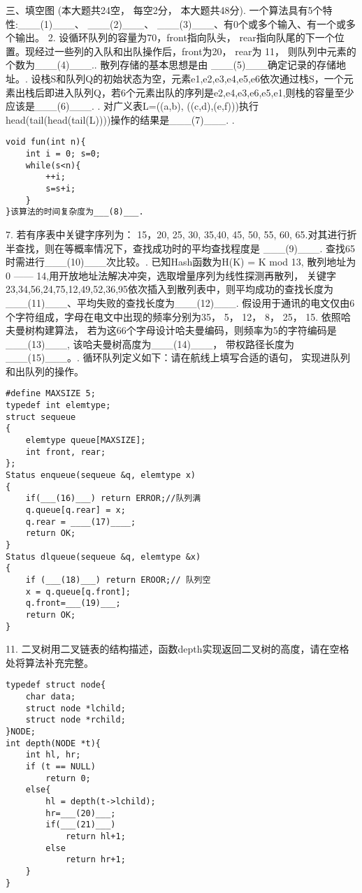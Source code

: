 三、填空图 (本大题共24空， 每空2分， 本大题共48分). 一个算法具有5个特性:\_\_\_(1)\_\_\_、 \_\_\_(2)\_\_\_、 \_\_\_(3)\_\_\_、有0个或多个输入、有一个或多个输出。
2. 设循环队列的容量为70，front指向队头， rear指向队尾的下一个位置。现经过一些列的入队和出队操作后，front为20， rear为 11， 则队列中元素的个数为\_\_\_(4)\_\_\_.. 散列存储的基本思想是由 \_\_\_(5)\_\_\_确定记录的存储地址。. 设栈S和队列Q的初始状态为空，元素e1,e2,e3,e4,e5,e6依次通过栈S，一个元素出栈后即进入队列Q，若6个元素出队的序列是e2,e4,e3,e6,e5,e1,则栈的容量至少应该是\_\_\_(6)\_\_\_. . 对广义表L=((a,b), ((c,d),(e,f)))执行head(tail(head(tail(L))))操作的结果是\_\_\_(7)\_\_\_. . 
\begin{lstlisting}[basicstyle=\small\ttfamily, caption={}, numbers=none]
void fun(int n){
	int i = 0; s=0;
	while(s<n){
		++i;
		s=s+i;
	}
}该算法的时间复杂度为___(8)___.
\end{lstlisting}
7. 若有序表中关键字序列为： 15，20, 25, 30, 35,40, 45, 50, 55, 60, 65.对其进行折半查找，则在等概率情况下，查找成功时的平均查找程度是
\_\_\_(9)\_\_\_. 查找65时需进行\_\_\_(10)\_\_\_次比较。. 已知Hash函数为H(K) = K mod 13, 散列地址为 0 —— 14,用开放地址法解决冲突，选取增量序列为线性探测再散列， 关键字23,34,56,24,75,12,49,52,36,95依次插入到散列表中，则平均成功的查找长度为\_\_\_(11)\_\_\_、平均失败的查找长度为\_\_\_(12)\_\_\_. 假设用于通讯的电文仅由6个字符组成，字母在电文中出现的频率分别为35， 5， 12， 8， 25， 15. 依照哈夫曼树构建算法， 若为这66个字母设计哈夫曼编码，则频率为5的字符编码是\_\_\_(13)\_\_\_, 该哈夫曼树高度为\_\_\_(14)\_\_\_， 带权路径长度为\_\_\_(15)\_\_\_。. 循环队列定义如下：请在航线上填写合适的语句， 实现进队列和出队列的操作。
\begin{lstlisting}[basicstyle=\small\ttfamily, caption={}, numbers=none]
#define MAXSIZE 5;
typedef int elemtype;
struct sequeue
{
	elemtype queue[MAXSIZE];
	int front, rear;
};
Status enqueue(sequeue &q, elemtype x)
{
	if(___(16)___) return ERROR;//队列满
	q.queue[q.rear] = x;
	q.rear = ____(17)____;
	return OK;
}
Status dlqueue(sequeue &q, elemtype &x)
{
	if (___(18)___) return EROOR;// 队列空
	x = q.queue[q.front];
	q.front=___(19)___;
	return OK;
}
\end{lstlisting}
11. 二叉树用二叉链表的结构描述，函数depth实现返回二叉树的高度，请在空格处将算法补充完整。
\begin{lstlisting}[basicstyle=\small\ttfamily, caption={}, numbers=none]
typedef struct node{
	char data;
	struct node *lchild;
	struct node *rchild;
}NODE;
int depth(NODE *t){
	int hl, hr;
	if (t == NULL)
		return 0;
	else{
		hl = depth(t->lchild);
		hr=___(20)___;
		if(___(21)___)
			return hl+1;
		else
			return hr+1;
	}
}
\end{lstlisting}

